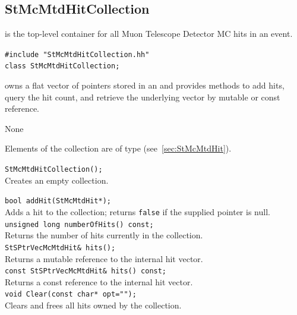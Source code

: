 \subsection{StMcMtdHitCollection}
 
\label{sec:StMcMtdHitCollection}
\begin{Entry}
\item[Summary]
     is the top-level container for all
    Muon Telescope Detector MC hits in an event.

\item[Synopsis]
    \verb+#include "StMcMtdHitCollection.hh"+\\
    \verb+class StMcMtdHitCollection;+\\

\item[Description]
     owns a flat vector of
     pointers stored in an
     and provides methods to add hits,
    query the hit count, and retrieve the underlying vector by
    mutable or const reference.

\item[Persistence]
    None

\item[Related Classes]
    Elements of the collection are of type
     (see~\ref{sec:StMcMtdHit}).

\item[Public\\ Constructors]
    \verb+StMcMtdHitCollection();+\\
    Creates an empty collection.

\item[Public Member\\ Functions]
    \verb+bool addHit(StMcMtdHit*);+\\
    Adds a hit to the collection; returns \texttt{false} if the
    supplied pointer is null.\\

    \verb+unsigned long numberOfHits() const;+\\
    Returns the number of hits currently in the collection.\\

    \verb+StSPtrVecMcMtdHit& hits();+\\
    Returns a mutable reference to the internal hit vector.\\

    \verb+const StSPtrVecMcMtdHit& hits() const;+\\
    Returns a const reference to the internal hit vector.\\

    \verb+void Clear(const char* opt="");+\\
    Clears and frees all hits owned by the collection.

\end{Entry}
\clearpage

